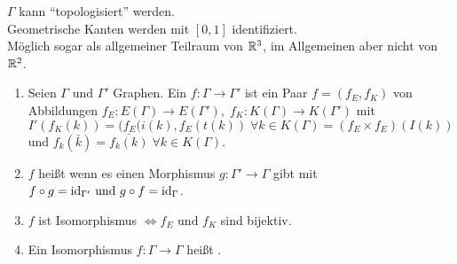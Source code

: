 \documentclass[a4paper, 10pt]{report}
\begin{document}
\begin{nnBem}
  $\Gamma$ kann ``topologisiert'' werden.\\
  Geometrische Kanten werden mit $[0,1]$ identifiziert.\\
  Möglich sogar	als allgemeiner Teilraum von $\mathbb{R}^3$, im Allgemeinen aber nicht
  von $\mathbb{R}^2$.
\end{nnBem}

\begin{DefBem}
\begin{enumerate}
  \item Seien $\Gamma \textrm{ und } \Gamma'$ Graphen.
  Ein  $f: \Gamma \to \Gamma'$ ist ein Paar $f = (f_E, f_K)$ von
  Abbildungen $f_E: E(\Gamma) \to E(\Gamma'), \; f_K: K(\Gamma) \to K(\Gamma')$
  mit $I'(f_K(k)) = (f_E(i(k), f_E(t(k)) \; \forall k \in K(\Gamma) = (f_E
  \times f_E)(I(k))$ und $f_k(\bar{k}) = \bar{f_k(k)} \; \forall k \in
  K(\Gamma)$.
  \item $f$ heißt  wenn es einen Morphismus $g: \Gamma' \to \Gamma$
  gibt mit $f \circ g = \textrm{id}_{\Gamma'} \textrm{ und } g \circ f = \textrm{id}_{\Gamma}$.
  \item $f$ ist Isomorphismus $\Leftrightarrow f_E \textrm{ und } f_K$ sind
  bijektiv.
  \item Ein Isomorphismus $f: \Gamma \to \Gamma$ heißt .
\end{enumerate}
\end{DefBem}

\end{document}
